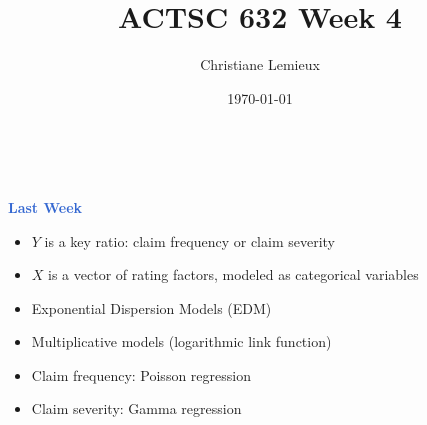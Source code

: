 \documentclass[aspectratio=169,professionalfonts,mathserif,handout]{beamer}
\title{ACTSC 632 Week 4}
\author{Christiane Lemieux}
\date{\today}
\newcommand{\highlight}[1]{\textcolor{Highlight}{\bf #1}}
\renewcommand{\(}{\left(}
\renewcommand{\)}{\right)}
\renewcommand{\[}{\left[}
\renewcommand{\]}{\right]}
\newcommand{\mytitle}[1]{\vspace*{-1mm}%
  \centerline{\highlight{\Large #1}}\vspace*{3mm}}
\newenvironment{slidebox}{%
  \begin{minipage}[c][7.5cm][t]{14.4cm}\raggedright}{%
  \end{minipage}}
\begin{document}

\begin{frame}
  \begin{slidebox}
    
    \vspace{7mm}
    \begin{center}
    \end{center}
    
    \vspace{6mm}
    
    \begin{center}
      \onslide<1>{%
      \highlight{\large Data Science with Actuarial Applications}\\[3mm]}
       \\[6mm]
    \end{center}
    
\end{slidebox}\end{frame}

\begin{frame}\begin{slidebox}
\mytitle{Last Week}

\begin{itemize}
    \item $Y$ is a key ratio: claim frequency or claim severity
    \pause
    \item $X$ is a vector of rating factors, modeled as categorical variables 
    \pause
    \item Exponential Dispersion Models (EDM)
    \pause
    \item Multiplicative models (logarithmic link function)
    \pause
    \item Claim frequency: Poisson regression
    \pause
    \item Claim severity: Gamma regression
\end{itemize}
\end{slidebox}\end{frame}
\end{document}
